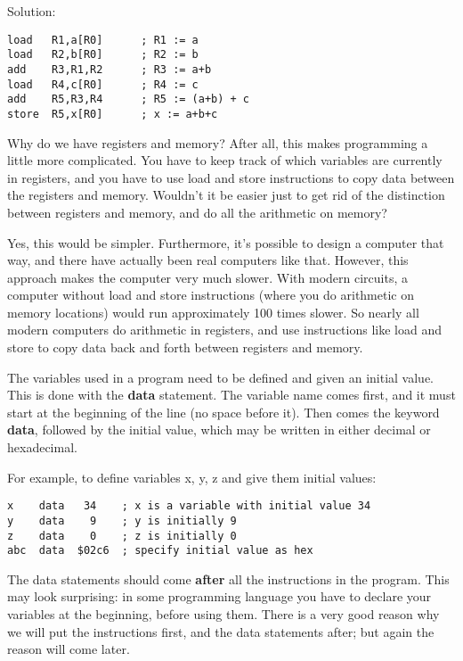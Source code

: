 \documentclass[11pt]{article}
\begin{document}
\begin{itemize}
Solution:

\begin{verbatim}
load   R1,a[R0]      ; R1 := a
load   R2,b[R0]      ; R2 := b
add    R3,R1,R2      ; R3 := a+b
load   R4,c[R0]      ; R4 := c
add    R5,R3,R4      ; R5 := (a+b) + c
store  R5,x[R0]      ; x := a+b+c
\end{verbatim}

Why do we have registers and memory?  After all, this makes
programming a little more complicated.  You have to keep track of
which variables are currently in registers, and you have to use load
and store instructions to copy data between the registers and memory.
Wouldn't it be easier just to get rid of the distinction between
registers and memory, and do all the arithmetic on memory?

Yes, this would be simpler.  Furthermore, it's possible to design a
computer that way, and there have actually been real computers like
that.  However, this approach makes the computer very much slower.
With modern circuits, a computer without load and store instructions
(where you do arithmetic on memory locations) would run approximately
100 times slower.  So nearly all modern computers do arithmetic in
registers, and use instructions like load and store to copy data back
and forth between registers and memory.

The variables used in a program need to be defined and given an
initial value.  This is done with the \textbf{data} statement.  The variable
name comes first, and it must start at the beginning of the line (no
space before it).  Then comes the keyword \textbf{data}, followed by the
initial value, which may be written in either decimal or hexadecimal.

For example, to define variables x, y, z and give them initial values:

\begin{verbatim}
x    data   34    ; x is a variable with initial value 34
y    data    9    ; y is initially 9
z    data    0    ; z is initially 0
abc  data  $02c6  ; specify initial value as hex
\end{verbatim}

The data statements should come \textbf{after} all the instructions in the
program.  This may look surprising: in some programming language you
have to declare your variables at the beginning, before using them.
There is a very good reason why we will put the instructions first,
and the data statements after; but again the reason will come later.


\end{itemize}
\end{document}
